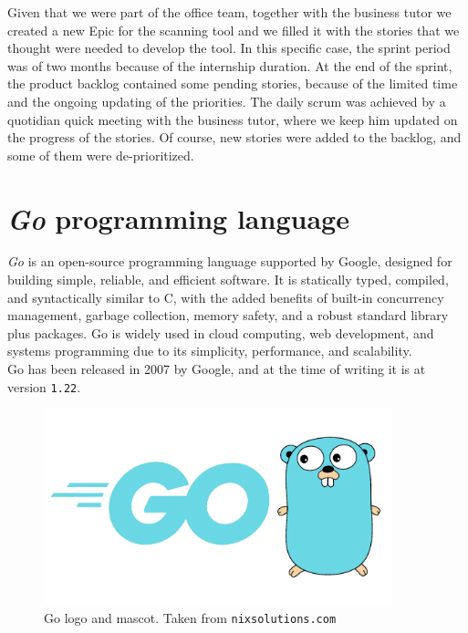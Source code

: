 
Given that we were part of the office team, together with the business tutor we created a new Epic for the scanning tool and we filled it with the stories that we thought were needed to develop the tool. In this specific case, the sprint period was of two months because of the internship duration. At the end of the sprint, the product backlog contained some pending stories, because of the limited time and the ongoing updating of the priorities. The daily scrum was achieved by a quotidian quick meeting with the business tutor, where we keep him updated on the progress of the stories. Of course, new stories were added to the backlog, and some of them were de-prioritized.

\section{\textit{Go} programming language}

\textit{Go} is an open-source programming language supported by Google, designed for building simple, reliable, and efficient software. It is statically typed, compiled, and syntactically similar to C, with the added benefits of built-in concurrency management, garbage collection, memory safety, and a robust standard library plus packages. Go is widely used in cloud computing, web development, and systems programming due to its simplicity, performance, and scalability.~\cite{go-lang-site}~\cite{go-lang-wikipedia}\\
Go has been released in 2007 by Google, and at the time of writing it is at version \texttt{1.22}.

\begin{figure}[h]
  \centering
  \includegraphics[width=0.9\textwidth]{chapters/04/assets/golang}
  \caption{Go logo and mascot. Taken from \texttt{nixsolutions.com}}
  \label{fig:go-logo-mascot}
\end{figure}

